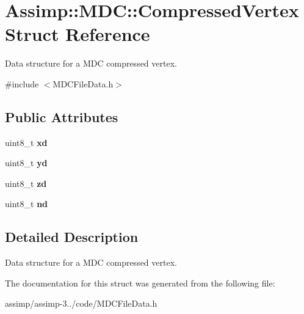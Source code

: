 \hypertarget{struct_assimp_1_1_m_d_c_1_1_compressed_vertex}{\section{Assimp\+:\+:M\+D\+C\+:\+:Compressed\+Vertex Struct Reference}
\label{struct_assimp_1_1_m_d_c_1_1_compressed_vertex}
}


Data structure for a M\+D\+C compressed vertex.  




{\ttfamily \#include $<$M\+D\+C\+File\+Data.\+h$>$}

\subsection*{Public Attributes}
\begin{DoxyCompactItemize}
\item 
\hypertarget{struct_assimp_1_1_m_d_c_1_1_compressed_vertex_abc81c099abd631a9535086e9a8c7b016}{uint8\+\_\+t {\bfseries xd}}\label{struct_assimp_1_1_m_d_c_1_1_compressed_vertex_abc81c099abd631a9535086e9a8c7b016}

\item 
\hypertarget{struct_assimp_1_1_m_d_c_1_1_compressed_vertex_a17726490a6e900ca827100bd4d7dbdff}{uint8\+\_\+t {\bfseries yd}}\label{struct_assimp_1_1_m_d_c_1_1_compressed_vertex_a17726490a6e900ca827100bd4d7dbdff}

\item 
\hypertarget{struct_assimp_1_1_m_d_c_1_1_compressed_vertex_ac79dad69782b9f78d1cb707ce9c2be58}{uint8\+\_\+t {\bfseries zd}}\label{struct_assimp_1_1_m_d_c_1_1_compressed_vertex_ac79dad69782b9f78d1cb707ce9c2be58}

\item 
\hypertarget{struct_assimp_1_1_m_d_c_1_1_compressed_vertex_afd3aa831b45ae2beb20d072601db9d3a}{uint8\+\_\+t {\bfseries nd}}\label{struct_assimp_1_1_m_d_c_1_1_compressed_vertex_afd3aa831b45ae2beb20d072601db9d3a}

\end{DoxyCompactItemize}


\subsection{Detailed Description}
Data structure for a M\+D\+C compressed vertex. 

The documentation for this struct was generated from the following file\+:\begin{DoxyCompactItemize}
\item 
assimp/assimp-\/3../code/M\+D\+C\+File\+Data.\+h\end{DoxyCompactItemize}
